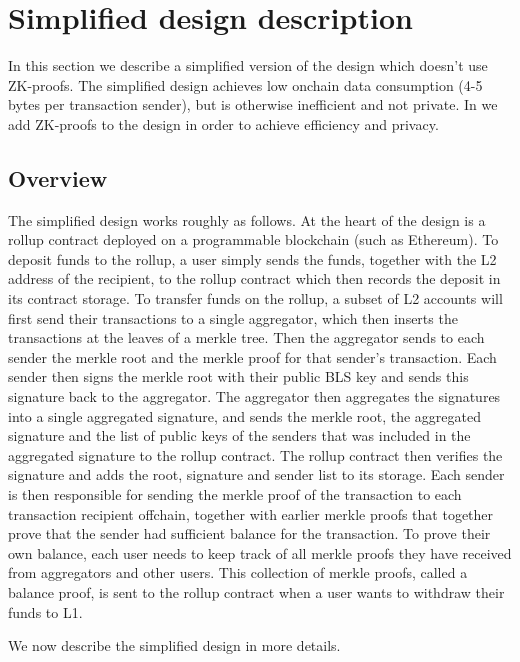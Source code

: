 \section{Simplified design description}\label{section:simplified-design}

In this section we describe a simplified version of the design which
doesn't use ZK-proofs. The simplified design achieves low onchain
data consumption (4-5 bytes per transaction sender), but is otherwise
inefficient and not private. In  we add ZK-proofs to
the design in order to achieve efficiency and privacy.

\subsection{Overview}

The simplified design works roughly as follows. At the heart of the
design is a rollup contract deployed on a programmable blockchain
(such as Ethereum). To deposit funds to the rollup, a user simply
sends the funds, together with the L2 address of the recipient, to
the rollup contract which then records the deposit in its contract
storage. To transfer funds on the rollup, a subset of L2 accounts
will first send their transactions to a single aggregator, which then
inserts the transactions at the leaves of a merkle tree. Then the
aggregator sends to each sender the merkle root and the merkle proof
for that sender's transaction. Each sender then signs the merkle root
with their public BLS key and sends this signature back to the
aggregator. The aggregator then aggregates the signatures into a
single aggregated signature, and sends the merkle root, the
aggregated signature and the list of public keys of the senders that
was included in the aggregated signature to the rollup contract. The
rollup contract then verifies the signature and adds the root,
signature and sender list to its storage. Each sender is then
responsible for sending the merkle proof of the transaction to each
transaction recipient offchain, together with earlier merkle proofs
that together prove that the sender had sufficient balance for the
transaction. To prove their own balance, each user needs to keep
track of all merkle proofs they have received from aggregators and
other users. This collection of merkle proofs, called a balance
proof, is sent to the rollup contract when a user wants to withdraw
their funds to L1.

We now describe the simplified design in more details.

